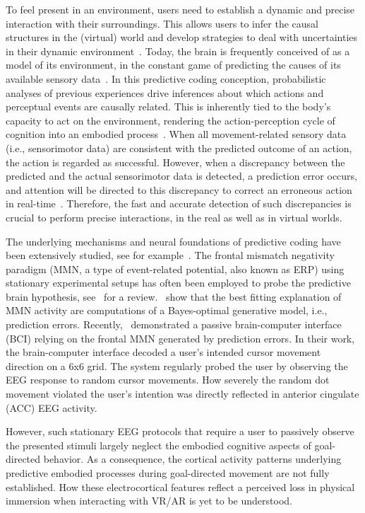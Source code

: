 To feel present in an environment, users need to establish a dynamic and precise interaction with their surroundings. This allows users to infer the causal structures in the (virtual) world and develop strategies to deal with uncertainties in their dynamic environment~\cite{Knill2004-sz}. Today, the brain is frequently conceived of as a model of its environment, in the constant game of predicting the causes of its available sensory data~\cite{Clark2013-ah, Friston2010-hy, Rao1999-zr}. In this predictive coding conception, probabilistic analyses of previous experiences drive inferences about which actions and perceptual events are causally related. This is inherently tied to the body’s capacity to act on the environment, rendering the action-perception cycle of cognition into an embodied process~\cite{Friston2012-gq}. When all movement-related sensory data (i.e., sensorimotor data) are consistent with the predicted outcome of an action, the action is regarded as successful. However, when a discrepancy between the predicted and the actual sensorimotor data is detected, a prediction error occurs, and attention will be directed to this discrepancy to correct an erroneous action in real-time~\cite{Savoie2018-ad}. Therefore, the fast and accurate detection of such discrepancies is crucial to perform precise interactions, in the real as well as in virtual worlds.

The underlying mechanisms and neural foundations of predictive coding have been extensively studied, see for example~\cite{Holroyd2002-in, Clark2013-ah, Bendixen2012-jx}. The frontal mismatch negativity paradigm (MMN, a type of event-related potential, also known as ERP) using stationary experimental setups has often been employed to probe the predictive brain hypothesis, see~\cite{Stefanics2014-vk} for a review.~\cite{Lieder2013-dl} show that the best fitting explanation of MMN activity are computations of a Bayes-optimal generative model, i.e., prediction errors. Recently,~\cite{Zander2016-ed} demonstrated a passive brain-computer interface (BCI) relying on the frontal MMN generated by prediction errors. In their work, the brain-computer interface decoded a user's intended cursor movement direction on a 6x6 grid. The system regularly probed the user by observing the EEG response to random cursor movements. How severely the random dot movement violated the user's intention was directly reflected in anterior cingulate (ACC) EEG activity. 

However, such stationary EEG protocols that require a user to passively observe the presented stimuli largely neglect the embodied cognitive aspects of goal-directed behavior. As a consequence, the cortical activity patterns underlying predictive embodied processes during goal-directed movement are not fully established. How these electrocortical features reflect a perceived loss in physical immersion when interacting with VR/AR is yet to be understood. 

